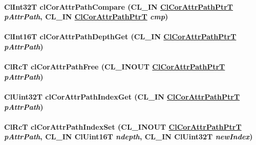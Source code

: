 \hypertarget{group__group13_ga141}{
\paragraph[clCorAttrPathCompare]{\setlength{\rightskip}{0pt plus 5cm}Cl\-Int32T cl\-Cor\-Attr\-Path\-Compare (CL\_\-IN \hyperlink{struct_cl_cor_attr_path}{Cl\-Cor\-Attr\-Path\-Ptr\-T} {\em p\-Attr\-Path}, CL\_\-IN \hyperlink{struct_cl_cor_attr_path}{Cl\-Cor\-Attr\-Path\-Ptr\-T} {\em cmp})}\hfill}
\label{group__group13_ga141}


\hypertarget{group__group13_ga136}{
\paragraph[clCorAttrPathDepthGet]{\setlength{\rightskip}{0pt plus 5cm}Cl\-Int16T cl\-Cor\-Attr\-Path\-Depth\-Get (CL\_\-IN \hyperlink{struct_cl_cor_attr_path}{Cl\-Cor\-Attr\-Path\-Ptr\-T} {\em p\-Attr\-Path})}\hfill}
\label{group__group13_ga136}


\hypertarget{group__group13_ga132}{
\paragraph[clCorAttrPathFree]{\setlength{\rightskip}{0pt plus 5cm}Cl\-Rc\-T cl\-Cor\-Attr\-Path\-Free (CL\_\-INOUT \hyperlink{struct_cl_cor_attr_path}{Cl\-Cor\-Attr\-Path\-Ptr\-T} {\em p\-Attr\-Path})}\hfill}
\label{group__group13_ga132}


\hypertarget{group__group13_ga139}{
\paragraph[clCorAttrPathIndexGet]{\setlength{\rightskip}{0pt plus 5cm}Cl\-Uint32T cl\-Cor\-Attr\-Path\-Index\-Get (CL\_\-IN \hyperlink{struct_cl_cor_attr_path}{Cl\-Cor\-Attr\-Path\-Ptr\-T} {\em p\-Attr\-Path})}\hfill}
\label{group__group13_ga139}


\hypertarget{group__group13_ga140}{
\paragraph[clCorAttrPathIndexSet]{\setlength{\rightskip}{0pt plus 5cm}Cl\-Rc\-T cl\-Cor\-Attr\-Path\-Index\-Set (CL\_\-INOUT \hyperlink{struct_cl_cor_attr_path}{Cl\-Cor\-Attr\-Path\-Ptr\-T} {\em p\-Attr\-Path}, CL\_\-IN Cl\-Uint16T {\em ndepth}, CL\_\-IN Cl\-Uint32T {\em new\-Index})}\hfill}
\label{group__group13_ga140}


